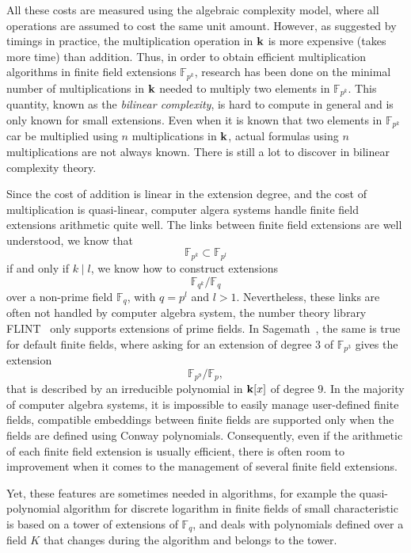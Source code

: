 All these costs are measured using the algebraic complexity model, where all operations
are assumed to cost the same unit amount. However, as suggested by timings in
practice, the multiplication operation in $\mathbf{k}$
is more expensive (\ie takes more time) than addition. Thus, in order to obtain
efficient multiplication algorithms in finite field extensions
$\mathbb{F}_{p^{k}}$, research has been done on the minimal number of
multiplications in $\mathbf{k}$ needed to multiply two elements in
$\mathbb{F}_{p^{k}}$. This quantity, known as the \emph{bilinear complexity}, is
hard to compute in general and is only known for small extensions. Even when it
is known that two elements in $\mathbb{F}_{p^{k}}$ car be multiplied using $n$
multiplications in $\mathbf{k}$, actual formulas using $n$ multiplications are not
always known. There is still a lot to discover in bilinear complexity theory.

Since the cost of addition is linear in the extension degree, and the cost of
multiplication is quasi-linear, computer algera systems handle finite field
extensions arithmetic quite well. The links between finite
field extensions are well understood, \eg we know that
\[
  \mathbb{F}_{p^{k}}\subset\mathbb{F}_{p^{l}}
\]
if and only if $k\mid l$, we know how to construct extensions
\[
  \mathbb{F}_{q^k}/\mathbb{F}_{q}
\]
over a non-prime field $\mathbb{F}_{q}$, with $q=p^l$ and $l>1$. Nevertheless,
these links are often not handled by computer algebra system, \eg the number
theory library FLINT~\cite{Flint} only supports extensions of prime fields. In
Sagemath~\cite{Sagemath}, the same is true for default finite fields, where
asking for an extension of degree $3$ of $\mathbb{F}_{p^{3}}$ gives the
extension
\[
  \mathbb{F}_{p^{9}}/\mathbb{F}_p,
\]
that is described by an irreducible polynomial in $\mathbf{k}[x]$ of degree $9$.
In the majority of computer algebra systems, it is
impossible to easily manage user-defined finite fields, \ie compatible
embeddings between finite fields are supported only when the fields are defined
using Conway polynomials. Consequently, even if the arithmetic of each finite
field extension is usually efficient, there is often room to improvement when it
comes to the management of several finite field extensions.

Yet, these features are sometimes needed in algorithms, for example the
quasi-polynomial algorithm for discrete logarithm in finite fields of small
characteristic~\cite{GKZ14} is based on a tower of extensions of $\mathbb{F}_q$,
and deals with polynomials defined over a field $K$ that changes during the
algorithm and belongs to the tower.

